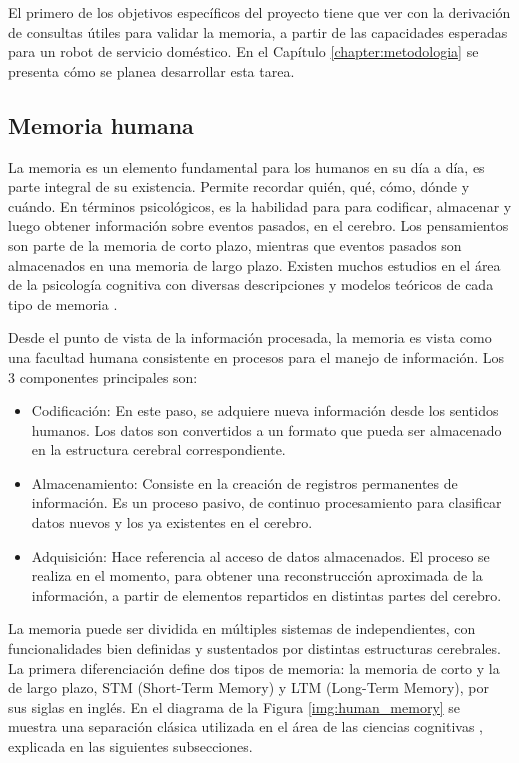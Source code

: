 El primero de los objetivos específicos del proyecto tiene que ver con la derivación de consultas útiles para validar la memoria, a partir de las capacidades esperadas para un robot de servicio doméstico. En el Capítulo \ref{chapter:metodologia} se presenta cómo se planea desarrollar esta tarea.


\subsection{Memoria humana}

La memoria es un elemento fundamental para los humanos en su día a día, es parte integral de su existencia. Permite recordar quién, qué, cómo, dónde y cuándo. En términos psicológicos, es la habilidad para para codificar, almacenar y luego obtener información sobre eventos pasados, en el cerebro. Los pensamientos son parte de la memoria de corto plazo, mientras que eventos pasados son almacenados en una memoria de largo plazo. Existen muchos estudios en el área de la psicología cognitiva con diversas descripciones y modelos teóricos de cada tipo de memoria \cite{Vijayakumar2014}.

Desde el punto de vista de la información procesada, la memoria es vista como una facultad humana consistente en procesos para el manejo de información. Los 3 componentes principales son:

\begin{itemize}[topsep=0pt]
	\setlength\itemsep{0.2em}
	\item Codificación: En este paso, se adquiere nueva información desde los sentidos humanos. Los datos son convertidos a un formato que pueda ser almacenado en la estructura cerebral correspondiente.
	\item Almacenamiento: Consiste en la creación de registros permanentes de información. Es un proceso pasivo, de continuo procesamiento para clasificar datos nuevos y los ya existentes en el cerebro.
	\item Adquisición: Hace referencia al acceso de datos almacenados. El proceso se realiza en el momento, para obtener una reconstrucción aproximada de la información, a partir de elementos repartidos en distintas partes del cerebro.
\end{itemize}


La memoria puede ser dividida en múltiples sistemas de independientes, con funcionalidades bien definidas y sustentados por distintas estructuras cerebrales. La primera diferenciación define dos tipos de memoria: la memoria de corto y la de largo plazo, STM (Short-Term Memory) y LTM (Long-Term Memory), por sus siglas en inglés. En el diagrama de la Figura \ref{img:human_memory} se muestra una separación clásica utilizada en el área de las ciencias cognitivas \cite{Eichenbaum:2008}, explicada en las siguientes subsecciones.

